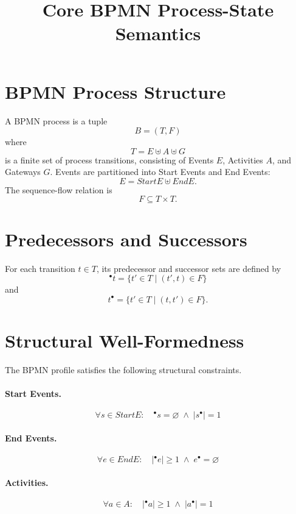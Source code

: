 \documentclass[11pt,a4paper]{article}
\title{Core BPMN Process-State Semantics}
\author{}
\date{}
\newcommand{\StartE}{\mathit{StartE}}
\newcommand{\EndE}{\mathit{EndE}}
\begin{document}
\maketitle

\section{BPMN Process Structure}

A BPMN process is a tuple
\[
B = (T, F)
\]
where
\[
T = E \uplus A \uplus G
\]
is a finite set of process transitions, consisting of Events $E$, Activities $A$, and Gateways $G$. Events are partitioned into Start Events and End Events:
\[
E = \StartE \uplus \EndE.
\]
The sequence-flow relation is
\[
F \subseteq T \times T.
\]

\section{Predecessors and Successors}

For each transition $t \in T$, its predecessor and successor sets are defined by
\[
{}^{\bullet}t = \{ t' \in T \mid (t',t) \in F \}
\]
and
\[
t^{\bullet} = \{ t' \in T \mid (t,t') \in F \}.
\]

\section{Structural Well-Formedness}

The BPMN profile satisfies the following structural constraints.

\paragraph{Start Events.}
\[
\forall s \in \StartE:\quad
{}^{\bullet}s = \varnothing
\;\land\;
|s^{\bullet}| = 1
\tag{WF-S}
\]

\paragraph{End Events.}
\[
\forall e \in \EndE:\quad
|{}^{\bullet}e| \geq 1
\;\land\;
e^{\bullet} = \varnothing
\tag{WF-E}
\]

\paragraph{Activities.}
\[
\forall a \in A:\quad
|{}^{\bullet}a| \geq 1
\;\land\;
|a^{\bullet}| = 1
\tag{WF-A}
\]
\end{document}
